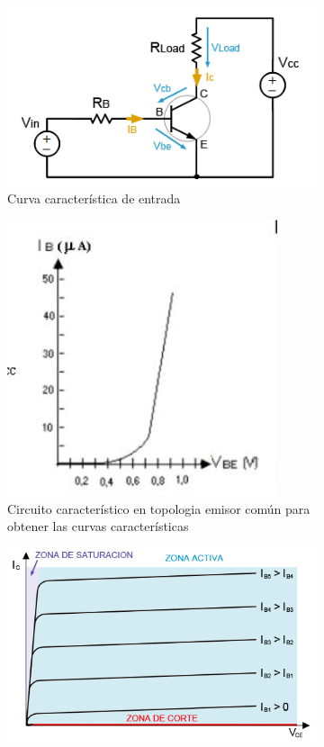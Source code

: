 \begin{figure}[h!]
	\begin{subfigure}{0.4\linewidth}
		\includegraphics[scale=0.5]{curva_entrada_bjt}
		\caption{Curva característica de entrada}
		\label {fig:circ_pol_bjt}
	\end{subfigure}
\hspace{15mm}
	\begin{subfigure}{0.4\linewidth}
		\includegraphics[scale=0.5]{curva_entrada_bjt_1}
		\caption{Circuito característico en topologia emisor común para obtener las curvas características}
		\label{fig:ib_vs_vbe}
	\end{subfigure}
\begin{center}
	\hspace{-25mm}
	\begin{subfigure}{0.4\linewidth}
		\includegraphics[scale=0.5]{Curva_ic_vs_vce}

\end{subfigure}
\end{center}
\end{figure}
